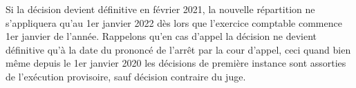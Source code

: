 Si la décision devient définitive en février 2021, la nouvelle répartition ne s'appliquera qu'au 1er janvier 2022 dès lors que l'exercice comptable commence 1er janvier de l'année.
Rappelons qu'en cas d'appel la décision ne devient définitive qu'à la date du prononcé de l'arrêt par la cour d'appel, ceci quand bien même depuis le 1er janvier 2020 les décisions de première instance sont assorties de l’exécution provisoire, sauf décision contraire du juge.